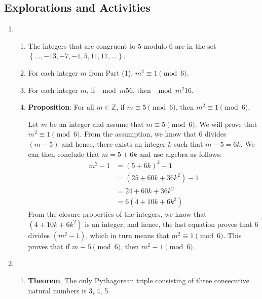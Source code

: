 \subsection*{Explorations and Activities}
\setcounter{oldenumi}{\theenumi}
\begin{enumerate} \setcounter{enumi}{\theoldenumi}
\item \begin{enumerate}
\item The integers that are congruent to 5 modulo 6 are in the set \\  
$\left\{ { \ldots ,  - 13,  - 7,  - 1, 5, 11, 17,  \ldots } \right\}$.

\item For each integer  $m$  from Part (1), $m^2  \equiv 1 \pmod 6$.  

\item For each integer $m$, if $\mod{m}{5}{6}$, then $\mod{m^2}{1}{6}$.

\item \textbf{Proposition}:  For all  $m \in \mathbb{Z}$, if  $m \equiv 5 \pmod 6$, then  
$m^2  \equiv 1 \pmod 6$.
\begin{myproof}
Let $m$ be an integer and assume that $m \equiv 5 \pmod 6$.  We will prove that 
$m^2  \equiv 1 \pmod 6$.  From the assumption, we know that 6 divides $(m - 5)$ and hence, there exists an integer $k$ such that $m - 5 = 6k$.  We can then conclude that 
$m = 5 + 6k$ and use algebra as follows:
\begin{align*}
m^2 - 1 &= \left( 5 + 6k \right)^2 - 1 \\
        &= \left( 25 + 60k + 36k^2 \right) - 1 \\
        &= 24 + 60k + 36k^2 \\
        &= 6 \left( 4 + 10k + 6k^2 \right)
\end{align*}
From the closure properties of the integers, we know that 
$\left( {4 + 10k + 6k^2 } \right)$ is an integer, and hence, the last equation proves that 6 divides $\left( m^2 - 1 \right)$, which in turn means that $m^2  \equiv 1 \pmod 6$.  This proves that if $m \equiv 5 \pmod 6$, then  $m^2  \equiv 1 \pmod 6$.
\end{myproof}
\end{enumerate}


\item \begin{enumerate}
\item \textbf{Theorem}.  The only Pythagorean triple consisting of three consecutive natural numbers is 3, 4, 5.


\end{enumerate}
\end{enumerate}
